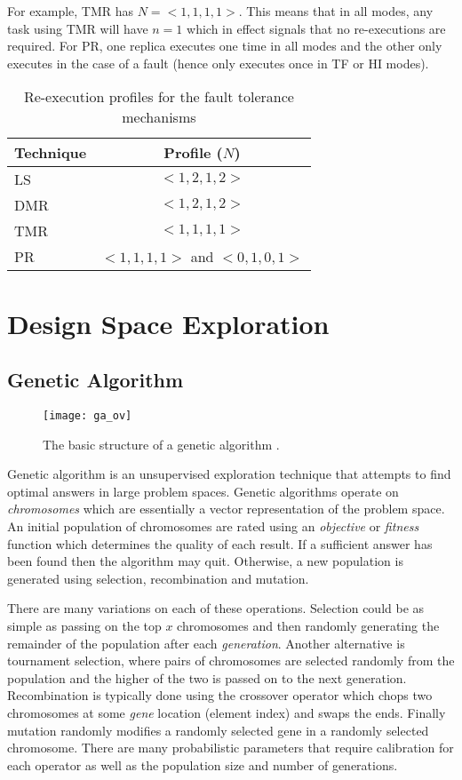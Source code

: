 	For example, TMR has $N=<1,1,1,1>$. This means that in all modes, any task using TMR will have $n=1$ which in effect signals that no re-executions are required. For PR, one replica executes one time in all modes and the other only executes in the case of a fault (hence only executes once in TF or HI modes).

	\begin{table}
\caption{Re-execution profiles for the fault tolerance mechanisms}
\label{t:reex}
\centering
	\begin{tabular}{@{}l|c@{}}
	\toprule
	Technique & Profile ($N$) \\
	\bottomrule
	LS & $<1,2,1,2>$ \\
	DMR & $<1,2,1,2>$ \\
	TMR & $<1,1,1,1>$ \\
	PR & $<1,1,1,1>$ and $<0,1,0,1>$ \\
	\end{tabular}
\end{table} 	

\section{Design Space Exploration}

\subsection{Genetic Algorithm}
\begin{figure}[h]
\centering
\texttt{[image: ga\_ov]}
\caption{The basic structure of a genetic algorithm \cite{geatbx}.}
\label{f:ga_ov}
\end{figure}

	Genetic algorithm is an unsupervised exploration technique that attempts to find optimal answers in large problem spaces. 
	Genetic algorithms operate on \emph{chromosomes} which are essentially a vector representation of the problem space.
	An initial population of chromosomes are rated using an \emph{objective} or \emph{fitness} function which determines the quality of each result. 
	If a sufficient answer has been found then the algorithm may quit.
	Otherwise, a new population is generated using selection, recombination and mutation. 
	
	There are many variations on each of these operations. Selection could be as simple as passing on the top $x$ chromosomes and then randomly generating the remainder of the population after each \emph{generation}. 
	Another alternative is tournament selection, where pairs of chromosomes are selected randomly from the population and the higher of the two is passed on to the next generation. 
	Recombination is typically done using the crossover operator which chops two chromosomes at some \emph{gene} location (element index) and swaps the ends.
	Finally mutation randomly modifies a randomly selected gene in a randomly selected chromosome.
	There are many probabilistic parameters that require calibration for each operator as well as the population size and number of generations.
	
